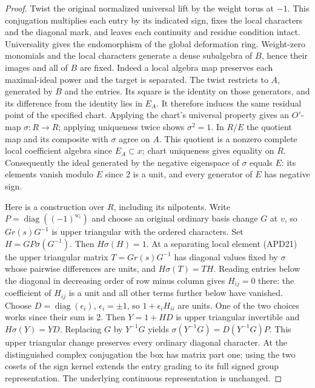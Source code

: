 \begin{proof}
Twist the original normalized universal lift by the weight torus at
\(-1\). This conjugation multiplies each entry by its indicated sign,
fixes the local characters and the diagonal mark, and leaves each
continuity and residue condition intact. Universality gives the
endomorphism of the global deformation ring. Weight-zero monomials and
the local characters generate a dense subalgebra of \(B\), hence their
images and all of \(B\) are fixed. Indeed a local algebra map preserves
each maximal-ideal power and the target is separated. The twist
restricts to \(A\), generated by \(B\) and the entries. Its square
is the identity on those generators, and its difference from the
identity lies in \(E_A\). It therefore induces the same residual point
of the specified chart. Applying the chart's universal property gives
an \(O'\)-map \(\sigma:R\to R\); applying uniqueness twice shows
\(\sigma^2=1\). In \(R/E\) the quotient map and its composite with
\(\sigma\) agree on \(A\). This quotient is a nonzero complete local
coefficient algebra since \(E_A\subset x\); chart uniqueness gives
equality on \(R\). Consequently the ideal generated by the negative
eigenspace of \(\sigma\) equals \(E\): its elements vanish modulo
\(E\) since 2 is a unit, and every generator of \(E\) has negative sign.

Here is a construction over \(R\), including its nilpotents. Write
\(P=\operatorname{diag}((-1)^{w_i})\) and choose an original ordinary
basis change \(G\) at \(v\), so \(Gr(s)G^{-1}\) is upper triangular
with the ordered characters. Set \(H=GP\sigma(G^{-1})\).
Then \(H\sigma(H)=1\). At a separating local element (APD21) the
upper triangular matrix \(T=Gr(s)G^{-1}\) has diagonal values fixed
by \(\sigma\) whose pairwise differences are units, and
\(H\sigma(T)=TH\). Reading entries below the diagonal in decreasing
order of row minus column gives \(H_{ij}=0\) there: the coefficient
of \(H_{ij}\) is a unit and all other terms further below have vanished.
Choose \(D=\operatorname{diag}(\epsilon_i)\), \(\epsilon_i=\pm1\),
so \(1+\epsilon_i H_{ii}\) are units. One of the two choices works
since their sum is 2. Then \(Y=1+HD\) is upper triangular invertible
and \(H\sigma(Y)=YD\). Replacing \(G\) by \(Y^{-1}G\) yields
\(\sigma(Y^{-1}G)=D(Y^{-1}G)P\). This upper triangular change
preserves every ordinary diagonal character. At the distinguished
complex conjugation the box has matrix part one; using the two cosets
of the sign kernel extends the entry grading to its full signed group
representation. The underlying continuous representation is unchanged.
\end{proof}

